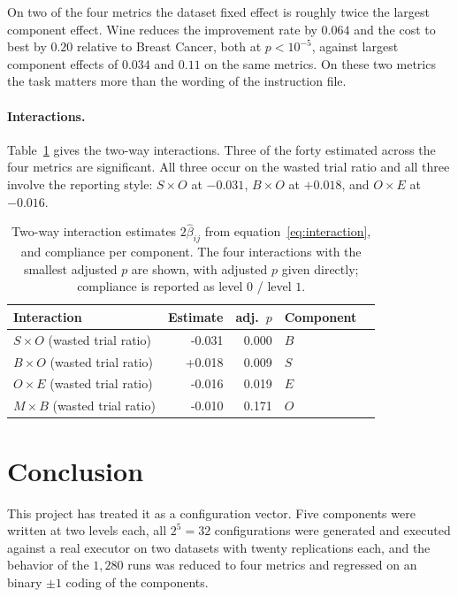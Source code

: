 \documentclass[11pt]{article}
\begin{document}
On two of the four metrics the dataset fixed effect is roughly twice the largest component effect. Wine reduces the improvement rate by $0.064$ and the cost to best by $0.20$ relative to Breast Cancer, both at $p<10^{-5}$, against largest component effects of $0.034$ and $0.11$ on the same metrics. On these two metrics the task matters more than the wording of the instruction file.

\paragraph{Interactions.} Table~\ref{tab:interactions} gives the two-way interactions. Three of the forty estimated across the four metrics are significant. All three occur on the wasted trial ratio and all three involve the reporting style: $S\times O$ at $-0.031$, $B\times O$ at $+0.018$, and $O\times E$ at $-0.016$.  

\begin{table}[t]
\centering
\small
\caption{Two-way interaction estimates $2\hat\beta_{ij}$ from equation~\eqref{eq:interaction}, and compliance per component. The four interactions with the smallest adjusted $p$ are
shown, with adjusted $p$ given directly; compliance is reported as level $0$ / level $1$.}
\label{tab:interactions}
\begin{tabular}{lrr@{\hskip 1.2cm}lr}
\toprule
Interaction & Estimate & adj.\ $p$ & Component  \\
\midrule
$S \times O$ (wasted trial ratio) & -0.031 & 0.000 & $B$  \\
$B \times O$ (wasted trial ratio) & +0.018 & 0.009 & $S$  \\
$O \times E$ (wasted trial ratio) & -0.016 & 0.019 & $E$  \\
$M \times B$ (wasted trial ratio) & -0.010 & 0.171 & $O$  \\
\bottomrule
\end{tabular}
\end{table}

\section{Conclusion}
\label{sec:conclusion}

This project has treated it as a configuration vector. Five components were written at two levels each, all $2^5=32$ configurations were generated and executed against a real executor on two datasets with twenty replications each, and the behavior of the $1{,}280$ runs was reduced to four metrics and regressed on an binary $\pm1$ coding of the components.
\end{document}
